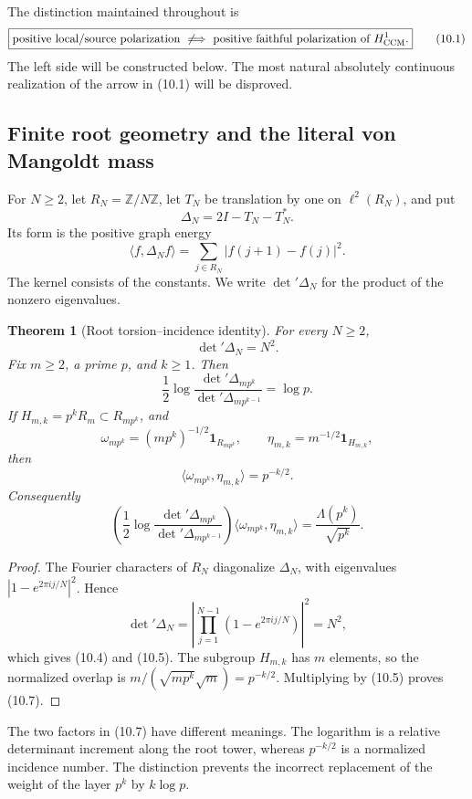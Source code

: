 \documentclass[11pt]{amsart}
\newtheorem{theorem}{Theorem}[section]
\theoremstyle{definition}
\theoremstyle{remark}
\begin{document}
The distinction maintained throughout is
\[
 \boxed{
 \text{positive local/source polarization}
 \ \not\Longrightarrow\ 
 \text{positive faithful polarization of }H^1_{\rm CCM}.}
 \tag{10.1}
\]
The left side will be constructed below.  The most natural absolutely
continuous realization of the arrow in (10.1) will be disproved.

\subsection{Finite root geometry and the literal von Mangoldt mass}

For \(N\ge2\), let \(R_N=\mathbb Z/N\mathbb Z\), let \(T_N\) be
translation by one on \(\ell^2(R_N)\), and put
\[
 \Delta_N=2I-T_N-T_N^*.
 \tag{10.2}
\]
Its form is the positive graph energy
\[
 \langle f,\Delta_Nf\rangle
 =\sum_{j\in R_N}|f(j+1)-f(j)|^2.
 \tag{10.3}
\]
The kernel consists of the constants.  We write \(\det'\Delta_N\) for
the product of the nonzero eigenvalues.

\begin{theorem}[Root torsion--incidence identity]
\label{thm:root-torsion}
For every \(N\ge2\),
\[
 \det'\Delta_N=N^2.
 \tag{10.4}
\]
Fix \(m\ge2\), a prime \(p\), and \(k\ge1\).  Then
\[
 \frac12\log
 \frac{\det'\Delta_{mp^k}}{\det'\Delta_{mp^{k-1}}}
 =\log p.
 \tag{10.5}
\]
If \(H_{m,k}=p^kR_m\subset R_{mp^k}\), and
\[
 \omega_{mp^k}=(mp^k)^{-1/2}\mathbf1_{R_{mp^k}},
 \qquad
 \eta_{m,k}=m^{-1/2}\mathbf1_{H_{m,k}},
\]
then
\[
 \langle\omega_{mp^k},\eta_{m,k}\rangle=p^{-k/2}.
 \tag{10.6}
\]
Consequently
\[
 \boxed{
 \left(\frac12\log
 \frac{\det'\Delta_{mp^k}}{\det'\Delta_{mp^{k-1}}}\right)
 \langle\omega_{mp^k},\eta_{m,k}\rangle
 =\frac{\Lambda(p^k)}{\sqrt{p^k}}.}
 \tag{10.7}
\]
\end{theorem}

\begin{proof}
The Fourier characters of \(R_N\) diagonalize \(\Delta_N\), with
eigenvalues \(|1-e^{2\pi ij/N}|^2\).  Hence
\[
 \det'\Delta_N
 =\left|\prod_{j=1}^{N-1}(1-e^{2\pi ij/N})\right|^2=N^2,
\]
which gives (10.4) and (10.5).  The subgroup \(H_{m,k}\) has \(m\)
elements, so the normalized overlap is
\(m/(\sqrt{mp^k}\sqrt m)=p^{-k/2}\).  Multiplying by (10.5)
proves (10.7).
\end{proof}

The two factors in (10.7) have different meanings.  The logarithm is a
relative determinant increment along the root tower, whereas
\(p^{-k/2}\) is a normalized incidence number.  The distinction prevents
the incorrect replacement of the weight of the layer \(p^k\) by
\(k\log p\).
\end{document}
